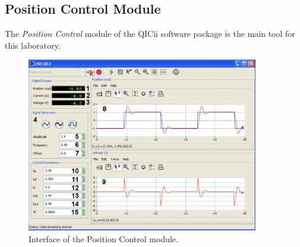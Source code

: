 \documentclass{article}
\begin{document}
\subsection{Position Control Module}
The \textit{Position Control} module of the QICii software package is the main tool for this laboratory.
\begin{figure}[h!]
    \centering
    \includegraphics[width=0.9\textwidth]{./USBQICii.png}
    \caption{Interface of the Position Control module.}
\end{figure}
\end{document}
